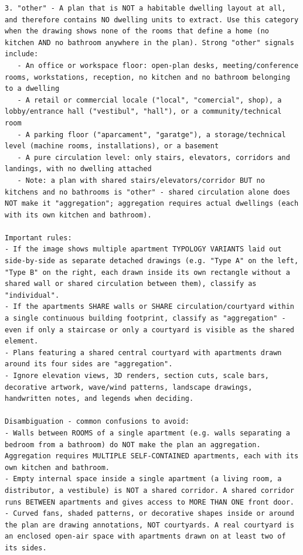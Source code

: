 \documentclass[12pt,a4paper,openright]{report}
\begin{document}
\begin{appendices}
\begin{lstlisting}[style=prompt]
3. "other" - A plan that is NOT a habitable dwelling layout at all, and therefore contains NO dwelling units to extract. Use this category when the drawing shows none of the rooms that define a home (no kitchen AND no bathroom anywhere in the plan). Strong "other" signals include:
   - An office or workspace floor: open-plan desks, meeting/conference rooms, workstations, reception, no kitchen and no bathroom belonging to a dwelling
   - A retail or commercial locale ("local", "comercial", shop), a lobby/entrance hall ("vestibul", "hall"), or a community/technical room
   - A parking floor ("aparcament", "garatge"), a storage/technical level (machine rooms, installations), or a basement
   - A pure circulation level: only stairs, elevators, corridors and landings, with no dwelling attached
   - Note: a plan with shared stairs/elevators/corridor BUT no kitchens and no bathrooms is "other" - shared circulation alone does NOT make it "aggregation"; aggregation requires actual dwellings (each with its own kitchen and bathroom).

Important rules:
- If the image shows multiple apartment TYPOLOGY VARIANTS laid out side-by-side as separate detached drawings (e.g. "Type A" on the left, "Type B" on the right, each drawn inside its own rectangle without a shared wall or shared circulation between them), classify as "individual".
- If the apartments SHARE walls or SHARE circulation/courtyard within a single continuous building footprint, classify as "aggregation" - even if only a staircase or only a courtyard is visible as the shared element.
- Plans featuring a shared central courtyard with apartments drawn around its four sides are "aggregation".
- Ignore elevation views, 3D renders, section cuts, scale bars, decorative artwork, wave/wind patterns, landscape drawings, handwritten notes, and legends when deciding.

Disambiguation - common confusions to avoid:
- Walls between ROOMS of a single apartment (e.g. walls separating a bedroom from a bathroom) do NOT make the plan an aggregation. Aggregation requires MULTIPLE SELF-CONTAINED apartments, each with its own kitchen and bathroom.
- Empty internal space inside a single apartment (a living room, a distributor, a vestibule) is NOT a shared corridor. A shared corridor runs BETWEEN apartments and gives access to MORE THAN ONE front door.
- Curved fans, shaded patterns, or decorative shapes inside or around the plan are drawing annotations, NOT courtyards. A real courtyard is an enclosed open-air space with apartments drawn on at least two of its sides.


\end{lstlisting}
\end{appendices}
\end{document}
